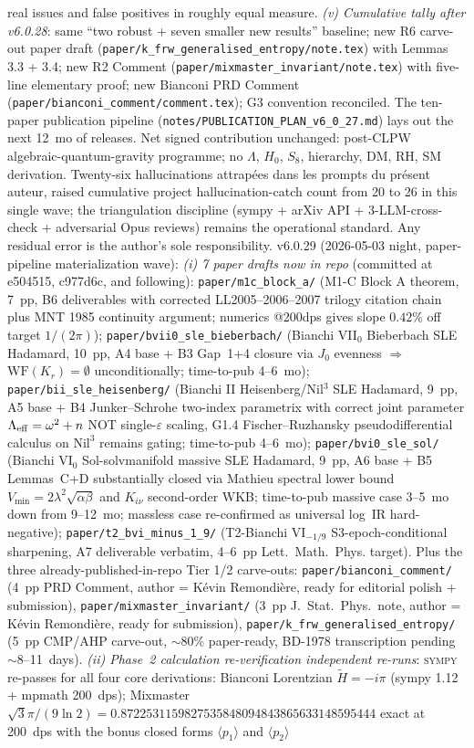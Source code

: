 \documentclass[reprint,amsmath,amssymb,aps,prd,superscriptaddress]{revtex4-2}
\providecommand{\1}{\mathbf{1}}
\begin{document}
real issues and false positives in roughly equal measure. \emph{(v) Cumulative tally after v6.0.28}: same ``two robust + seven smaller new results'' baseline; new R6 carve-out paper draft (\texttt{paper/k\_frw\_generalised\_entropy/note.tex}) with Lemmas 3.3 + 3.4; new R2 Comment (\texttt{paper/mixmaster\_invariant/note.tex}) with five-line elementary proof; new Bianconi PRD Comment (\texttt{paper/bianconi\_comment/comment.tex}); G3 convention reconciled. The ten-paper publication pipeline (\texttt{notes/PUBLICATION\_PLAN\_v6\_0\_27.md}) lays out the next 12~mo of releases. Net signed contribution unchanged: post-CLPW algebraic-quantum-gravity programme; no $\Lambda$, $H_0$, $S_8$, hierarchy, DM, RH, SM derivation. Twenty-six hallucinations attrapées dans les prompts du présent auteur, raised cumulative project hallucination-catch count from 20 to 26 in this single wave; the triangulation discipline (sympy + arXiv API + 3-LLM-cross-check + adversarial Opus reviews) remains the operational standard.  Any residual error is the author's sole responsibility. v6.0.29 (2026-05-03 night, paper-pipeline materialization wave): \emph{(i) 7 paper drafts now in repo} (committed at e504515, c977d6c, and following): \texttt{paper/m1c\_block\_a/} (M1-C Block A theorem, 7~pp, B6 deliverables with corrected LL2005--2006--2007 trilogy citation chain plus MNT 1985 continuity argument; numerics @200dps gives slope $0.42\%$ off target $1/(2\pi)$); \texttt{paper/bvii0\_sle\_bieberbach/} (Bianchi VII$_0$ Bieberbach SLE Hadamard, 10~pp, A4 base + B3 Gap~1+4 closure via $J_0$ evenness $\Rightarrow$ $\mathrm{WF}(K_r)=\emptyset$ unconditionally; time-to-pub 4--6~mo); \texttt{paper/bii\_sle\_heisenberg/} (Bianchi II Heisenberg/Nil$^3$ SLE Hadamard, 9~pp, A5 base + B4 Junker--Schrohe two-index parametrix with correct joint parameter $\Lambda_{\rm eff}=\omega^2+n$ NOT single-$\varepsilon$ scaling, G1.4 Fischer--Ruzhansky pseudodifferential calculus on $\mathrm{Nil}^3$ remains gating; time-to-pub 4--6~mo); \texttt{paper/bvi0\_sle\_sol/} (Bianchi VI$_0$ Sol-solvmanifold massive SLE Hadamard, 9~pp, A6 base + B5 Lemmas~C+D substantially closed via Mathieu spectral lower bound $V_{\min}=2\lambda^2\sqrt{\alpha\beta}$ and $K_{i\nu}$ second-order WKB; time-to-pub massive case 3--5~mo down from 9--12~mo; massless case re-confirmed as universal log~IR hard-negative); \texttt{paper/t2\_bvi\_minus\_1\_9/} (T2-Bianchi VI$_{-1/9}$ S3-epoch-conditional sharpening, A7 deliverable verbatim, 4--6~pp Lett.~Math.~Phys. target). Plus the three already-published-in-repo Tier 1/2 carve-outs: \texttt{paper/bianconi\_comment/} (4~pp PRD Comment, author = Kévin Remondi\`ere, ready for editorial polish + submission), \texttt{paper/mixmaster\_invariant/} (3~pp J.~Stat.~Phys.\ note, author = Kévin Remondi\`ere, ready for submission), \texttt{paper/k\_frw\_generalised\_entropy/} (5~pp CMP/AHP carve-out, $\sim$80\% paper-ready, BD-1978 transcription pending $\sim$8--11~days). \emph{(ii) Phase~2 calculation re-verification independent re-runs}: \textsc{sympy} re-passes for all four core derivations: Bianconi Lorentzian $\tilde H = -i\pi$ (sympy 1.12 + mpmath 200~dps); Mixmaster $\sqrt{3}\pi/(9\ln 2) = 0.8722531159827535848094843865633148595444$ exact at 200~dps with the bonus closed forms $\langle p_1\rangle$ and $\langle p_2\rangle$ 
\end{document}
